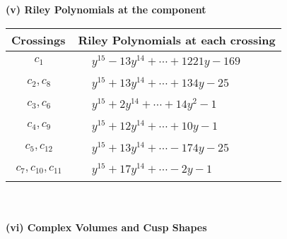 \documentclass[1p]{elsarticle_modified}
\theoremstyle{definition}
\begin{document}
\newpage\renewcommand{\arraystretch}{1}
\flushleft \textbf{(v) Riley Polynomials at the component}\newline \\
\begin{tabular}{m{50pt}|m{274pt}}
Crossings & \hspace{64pt}Riley Polynomials at each crossing \\
\hline $$\begin{aligned}c_{1}\end{aligned}$$&$\begin{aligned}
&y^{15}-13 y^{14}+\cdots+1221 y-169
\end{aligned}$\\
\hline $$\begin{aligned}c_{2},c_{8}\end{aligned}$$&$\begin{aligned}
&y^{15}+13 y^{14}+\cdots+134 y-25
\end{aligned}$\\
\hline $$\begin{aligned}c_{3},c_{6}\end{aligned}$$&$\begin{aligned}
&y^{15}+2 y^{14}+\cdots+14 y^2-1
\end{aligned}$\\
\hline $$\begin{aligned}c_{4},c_{9}\end{aligned}$$&$\begin{aligned}
&y^{15}+12 y^{14}+\cdots+10 y-1
\end{aligned}$\\
\hline $$\begin{aligned}c_{5},c_{12}\end{aligned}$$&$\begin{aligned}
&y^{15}+13 y^{14}+\cdots-174 y-25
\end{aligned}$\\
\hline $$\begin{aligned}c_{7},c_{10},c_{11}\end{aligned}$$&$\begin{aligned}
&y^{15}+17 y^{14}+\cdots-2 y-1
\end{aligned}$\\
\hline
\end{tabular}\\~\\
\newpage\flushleft \textbf{(vi) Complex Volumes and Cusp Shapes}
\end{document}
